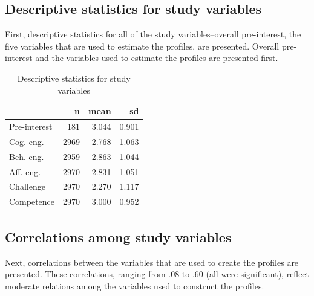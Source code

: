 \documentclass[]{msu-thesis}
\theoremstyle{definition}
\theoremstyle{definition}
\theoremstyle{definition}
\theoremstyle{remark}
\begin{document}
\subsection{Descriptive statistics for study
variables}\label{descriptive-statistics-for-study-variables}

First, descriptive statistics for all of the study variables--overall
pre-interest, the five variables that are used to estimate the profiles,
are presented. Overall pre-interest and the variables used to estimate
the profiles are presented first.

\begin{table}

\caption{\label{tab:unnamed-chunk-7}Descriptive statistics for study variables}
\centering
\begin{tabular}[t]{lrrr}
\toprule
 & n & mean & sd\\
\midrule
Pre-interest & 181 & 3.044 & 0.901\\
Cog. eng. & 2969 & 2.768 & 1.063\\
Beh. eng. & 2959 & 2.863 & 1.044\\
Aff. eng. & 2970 & 2.831 & 1.051\\
Challenge & 2970 & 2.270 & 1.117\\
Competence & 2970 & 3.000 & 0.952\\
\bottomrule
\end{tabular}
\end{table}

\subsection{Correlations among study
variables}\label{correlations-among-study-variables}

Next, correlations between the variables that are used to create the
profiles are presented. These correlations, ranging from .08 to .60 (all
were significant), reflect moderate relations among the variables used
to construct the profiles.

\begin{landscape}\begin{table}

\caption{\label{tab:unnamed-chunk-8}Correlations among study variables}
\centering
{}
\end{table}
\end{landscape}
\end{document}

